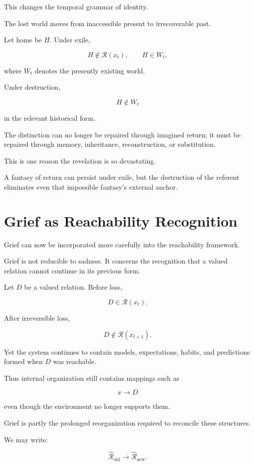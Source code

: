 \documentclass[11pt,oneside]{book}
\theoremstyle{definition}
\theoremstyle{remark}
\newcommand{\R}{\mathcal{R}}
\begin{document}
This changes the temporal grammar of identity.

The lost world moves from inaccessible present to irrecoverable past.

Let home be \(H\). Under exile,

\[
H\notin\R(x_t),
\qquad
H\in W_t,
\]

where \(W_t\) denotes the presently existing world.

Under destruction,

\[
H\notin W_t
\]

in the relevant historical form.

The distinction can no longer be repaired through imagined return; it must be repaired through memory, inheritance, reconstruction, or substitution.

This is one reason the revelation is so devastating.

A fantasy of return can persist under exile, but the destruction of the referent eliminates even that impossible fantasy's external anchor.

\section{Grief as Reachability Recognition}

Grief can now be incorporated more carefully into the reachability framework.

Grief is not reducible to sadness. It concerns the recognition that a valued relation cannot continue in its previous form.

Let \(D\) be a valued relation. Before loss,

\[
D\in\R(x_t).
\]

After irreversible loss,

\[
D\notin\R(x_{t+1}).
\]

Yet the system continues to contain models, expectations, habits, and predictions formed when \(D\) was reachable.

Thus internal organization still contains mappings such as

\[
x\rightarrow D
\]

even though the environment no longer supports them.

Grief is partly the prolonged reorganization required to reconcile these structures.

We may write:

\[
\widehat{\R}_{\mathrm{old}}
\rightarrow
\widehat{\R}_{\mathrm{new}}.
\]
\end{document}
